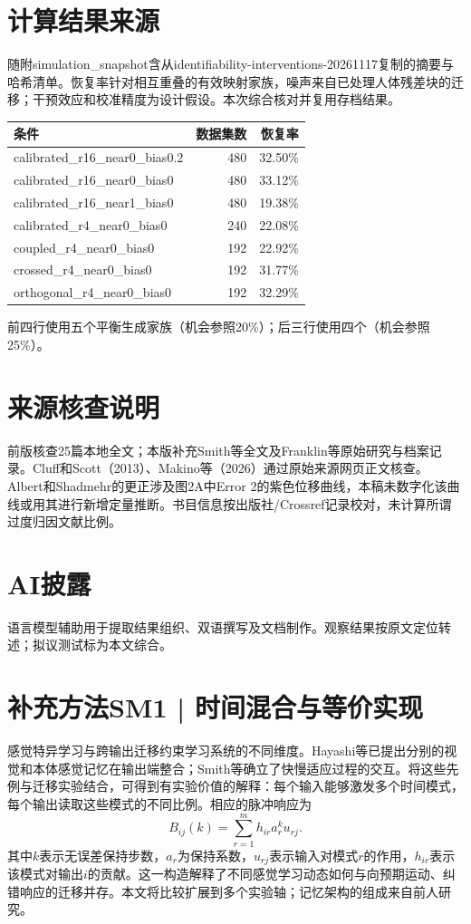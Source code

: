 \documentclass[11pt,a4paper]{article}
\begin{document}
\clearpage\section{计算结果来源}
随附simulation\_snapshot含从identifiability-interventions-20261117复制的摘要与哈希清单。恢复率针对相互重叠的有效映射家族，噪声来自已处理人体残差块的迁移；干预效应和校准精度为设计假设。本次综合核对并复用存档结果。
\begin{center}\small\begin{tabular}{lrr}\toprule
条件 & 数据集数 & 恢复率\\\midrule
calibrated\_r16\_near0\_bias0.2 & 480 & 32.50\%\\
calibrated\_r16\_near0\_bias0 & 480 & 33.12\%\\
calibrated\_r16\_near1\_bias0 & 480 & 19.38\%\\
calibrated\_r4\_near0\_bias0 & 240 & 22.08\%\\
coupled\_r4\_near0\_bias0 & 192 & 22.92\%\\
crossed\_r4\_near0\_bias0 & 192 & 31.77\%\\
orthogonal\_r4\_near0\_bias0 & 192 & 32.29\%\\
\bottomrule\end{tabular}\end{center}
前四行使用五个平衡生成家族（机会参照20\%）；后三行使用四个（机会参照25\%）。
\section{来源核查说明}
前版核查25篇本地全文；本版补充Smith等全文及Franklin等原始研究与档案记录。Cluff和Scott（2013）、Makino等（2026）通过原始来源网页正文核查。Albert和Shadmehr的更正涉及图2A中Error 2的紫色位移曲线，本稿未数字化该曲线或用其进行新增定量推断。书目信息按出版社/Crossref记录校对，未计算所谓过度归因文献比例。
\section{AI披露}
语言模型辅助用于提取结果组织、双语撰写及文档制作。观察结果按原文定位转述；拟议测试标为本文综合。
\clearpage\section{补充方法SM1 | 时间混合与等价实现}

感觉特异学习与跨输出迁移约束学习系统的不同维度。Hayashi等已提出分别的视觉和本体感觉记忆在输出端整合；Smith等确立了快慢适应过程的交互。将这些先例与迁移实验结合，可得到有实验价值的解释：每个输入能够激发多个时间模式，每个输出读取这些模式的不同比例。相应的脉冲响应为
\begin{equation}B_{ij}(k)=\sum_{r=1}^{m}h_{ir}a_r^k u_{rj}.\label{eq:worked}\end{equation}
其中$k$表示无误差保持步数，$a_r$为保持系数，$u_{rj}$表示输入对模式$r$的作用，$h_{ir}$表示该模式对输出$i$的贡献。这一构造解释了不同感觉学习动态如何与向预期运动、纠错响应的迁移并存。本文将比较扩展到多个实验轴；记忆架构的组成来自前人研究。\cite{hayashi2020,smith2006,wagner2008,maeda2020}
\end{document}
